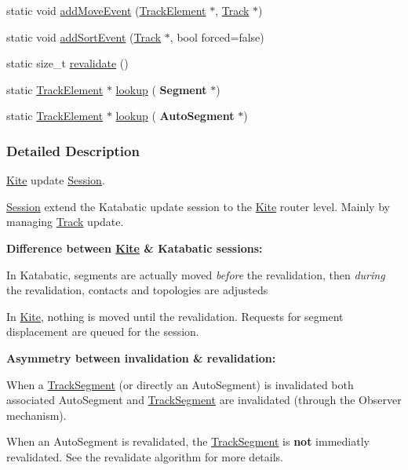 \begin{DoxyCompactItemize}
\item 
static void \mbox{\hyperlink{classKite_1_1Session_aa42e4cb9e2559c00d68821f535ef7838}{add\+Move\+Event}} (\mbox{\hyperlink{classKite_1_1TrackElement}{Track\+Element}} $\ast$, \mbox{\hyperlink{classKite_1_1Track}{Track}} $\ast$)
\item 
static void \mbox{\hyperlink{classKite_1_1Session_a990d32b1f1ea661b088a05f86319772f}{add\+Sort\+Event}} (\mbox{\hyperlink{classKite_1_1Track}{Track}} $\ast$, bool forced=false)
\item 
static size\+\_\+t \mbox{\hyperlink{classKite_1_1Session_a5bd93abe1416952ace15a98dbeeed124}{revalidate}} ()
\item 
static \mbox{\hyperlink{classKite_1_1TrackElement}{Track\+Element}} $\ast$ \mbox{\hyperlink{classKite_1_1Session_a1728621b96081c32fb7bfb18a0ebfad3}{lookup}} (\textbf{ Segment} $\ast$)
\item 
static \mbox{\hyperlink{classKite_1_1TrackElement}{Track\+Element}} $\ast$ \mbox{\hyperlink{classKite_1_1Session_a3946039ef19b5b6994171288f183bdaf}{lookup}} (\textbf{ Auto\+Segment} $\ast$)
\end{DoxyCompactItemize}


\subsubsection{Detailed Description}
\mbox{\hyperlink{namespaceKite}{Kite}} update \mbox{\hyperlink{classKite_1_1Session}{Session}}. 

\mbox{\hyperlink{classKite_1_1Session}{Session}} extend the Katabatic update session to the \mbox{\hyperlink{namespaceKite}{Kite}} router level. Mainly by managing \mbox{\hyperlink{classKite_1_1Track}{Track}} update.

{\bfseries Difference between \mbox{\hyperlink{namespaceKite}{Kite}} \& Katabatic sessions\+:}
\begin{DoxyItemize}
\item In Katabatic, segments are actually moved {\itshape before} the revalidation, then {\itshape during} the revalidation, contacts and topologies are adjusteds
\item In \mbox{\hyperlink{namespaceKite}{Kite}}, nothing is moved until the revalidation. Requests for segment displacement are queued for the session.
\end{DoxyItemize}

{\bfseries Asymmetry between invalidation \& revalidation\+:}
\begin{DoxyItemize}
\item When a \mbox{\hyperlink{classKite_1_1TrackSegment}{Track\+Segment}} (or directly an Auto\+Segment) is invalidated both associated Auto\+Segment and \mbox{\hyperlink{classKite_1_1TrackSegment}{Track\+Segment}} are invalidated (through the Observer mechanism).
\item When an Auto\+Segment is revalidated, the \mbox{\hyperlink{classKite_1_1TrackSegment}{Track\+Segment}} is {\bfseries not} immediatly revalidated. See the revalidate algorithm for more details.
\end{DoxyItemize}

